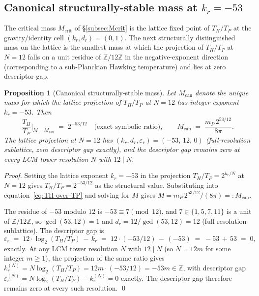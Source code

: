 \documentclass[11pt,a4paper]{article}
\newtheorem{proposition}[theorem]{Proposition}
\theoremstyle{definition}
\theoremstyle{remark}
\begin{document}
\subsection{Canonical structurally-stable mass at \texorpdfstring{$k_{r}=-53$}{kr=-53}}\label{subsec:canonical-mass}

The critical mass $M_{\mathrm{crit}}$ of \S\ref{subsec:Mcrit} is the lattice fixed point of $T_{H}/T_{P}$ at the gravity/identity cell $(k_{r},d_{r}) = (0,1)$. The next structurally distinguished mass on the lattice is the smallest mass at which the projection of $T_{H}/T_{P}$ at $N = 12$ falls on a unit residue of $\mathbb{Z}/12\mathbb{Z}$ in the negative-exponent direction (corresponding to a sub-Planckian Hawking temperature) and lies at zero descriptor gap.

\begin{proposition}[Canonical structurally-stable mass]\label{prop:canonical-mass}
Let $M_{\text{can}}$ denote the unique mass for which the lattice projection of $T_{H}/T_{P}$ at $N = 12$ has integer exponent $k_{r} = -53$. Then
\[
\frac{T_{H}}{T_{P}}\bigg|_{M = M_{\text{can}}} \;=\; 2^{-53/12} \quad\text{(exact symbolic ratio)},
\qquad
M_{\text{can}} \;=\; \frac{m_{P}\,2^{53/12}}{8\pi}.
\]
The lattice projection at $N = 12$ has $(k_{r},d_{r},\varepsilon_{r}) = (-53,\,12,\,0)$ (full-resolution sublattice, zero descriptor gap exactly), and the descriptor gap remains zero at every LCM tower resolution $N$ with $12 \mid N$.
\end{proposition}

\begin{proof}
Setting the lattice exponent $k_{r} = -53$ in the projection $T_{H}/T_{P} = 2^{k_{r}/N}$ at $N = 12$ gives $T_{H}/T_{P} = 2^{-53/12}$ as the structural value. Substituting into equation~\eqref{eq:TH-over-TP} and solving for $M$ gives $M = m_{P}\,2^{53/12}/(8\pi) =: M_{\text{can}}$.

The residue of $-53$ modulo $12$ is $-53 \equiv 7 \pmod{12}$, and $7 \in \{1,5,7,11\}$ is a unit of $\mathbb{Z}/12\mathbb{Z}$, so $\gcd(53,12) = 1$ and $d_{r} = 12/\gcd(53,12) = 12$ (full-resolution sublattice). The descriptor gap is
\[
\varepsilon_{r} \;=\; 12 \cdot \log_{2}(T_{H}/T_{P}) \,-\, k_{r} \;=\; 12 \cdot (-53/12) \,-\, (-53) \;=\; -53 \,+\, 53 \;=\; 0,
\]
exactly. At any LCM tower resolution $N$ with $12 \mid N$ (so $N = 12m$ for some integer $m \ge 1$), the projection of the same ratio gives $k_{r}^{(N)} = N \log_{2}(T_{H}/T_{P}) = 12m \cdot (-53/12) = -53m \in \mathbb{Z}$, with descriptor gap $\varepsilon_{r}^{(N)} = N \log_{2}(T_{H}/T_{P}) - k_{r}^{(N)} = 0$ exactly. The descriptor gap therefore remains zero at every such resolution. \qed
\end{proof}
\end{document}
